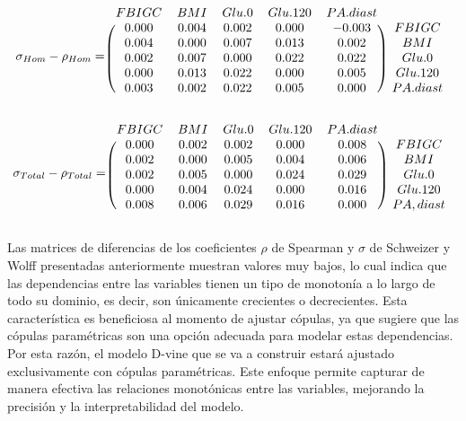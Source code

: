  \[
\sigma_{Hom} - \rho_{Hom} = \begin{blockarray}{cccccc}
FBIGC      &      BMI      &    Glu.0      &  Glu.120      & PA.diast \\
\begin{block}{(ccccc)c}
0.000 & 0.004 & 0.002  & 0.000  & -0.003 & FBIGC \\
0.004 & 0.000 & 0.007  & 0.013  &  0.002 & BMI \\
0.002 & 0.007 & 0.000  & 0.022  &  0.022 & Glu.0 \\
0.000 & 0.013 & 0.022  & 0.000  &  0.005 & Glu.120 \\
0.003 & 0.002 & 0.022  & 0.005  &  0.000 & PA.diast \\   
\end{block}
\end{blockarray}
 \]

 \[
\sigma_{Total} - \rho_{Total} = \begin{blockarray}{cccccc}
FBIGC      &      BMI      &    Glu.0      &  Glu.120      & PA.diast \\
\begin{block}{(ccccc)c}
 0.000 & 0.002 & 0.002  & 0.000  &  0.008 & FBIGC \\
 0.002 & 0.000 & 0.005  & 0.004  &  0.006 & BMI \\
 0.002 & 0.005 & 0.000  & 0.024  &  0.029 & Glu.0 \\
 0.000 & 0.004 & 0.024  & 0.000  &  0.016 & Glu.120 \\
 0.008 & 0.006 & 0.029  & 0.016  &  0.000 & PA,diast \\
\end{block}
\end{blockarray}
 \]

Las matrices de diferencias de los coeficientes $\rho$ de Spearman y $\sigma$ de Schweizer y Wolff presentadas anteriormente muestran valores muy bajos, lo cual indica que las dependencias entre las variables tienen un tipo de monotonía a lo largo de todo su dominio, es decir, son únicamente crecientes o decrecientes. Esta característica es beneficiosa al momento de ajustar cópulas, ya que sugiere que las cópulas paramétricas son una opción adecuada para modelar estas dependencias. Por esta razón, el modelo D-vine que se va a construir estará ajustado exclusivamente con cópulas paramétricas. Este enfoque permite capturar de manera efectiva las relaciones monotónicas entre las variables, mejorando la precisión y la interpretabilidad del modelo.



